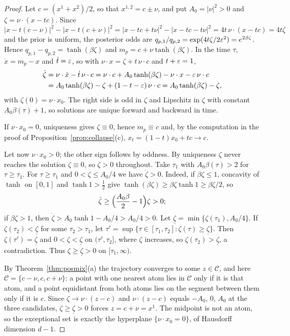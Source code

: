 \documentclass{article} %
\makeatletter
\newif\ificlr
\newcommand{\placeblock}[1]{\ificlr\@nameuse{moved@#1}\fi}
\theoremstyle{plain}
\theoremstyle{definition}
\theoremstyle{remark}
\makeatother
\begin{document}
\label{apx:pf-hyperplane}
\ificlr\placeblock{hyperplane}\else\prophyperplane*\fi
\begin{proof}
Let $c=(x^1+x^2)/2$, so that $x^{1,2}=c\pm\nu$, and put $A_0=|\nu|^2>0$ and
$\zeta=\nu\cdot(x-tc)$. Since
\[
|x-t(c-\nu)|^2-|x-t(c+\nu)|^2=|x-tc+t\nu|^2-|x-tc-t\nu|^2=4t\,\nu\cdot(x-tc)=4t\zeta
\]
and the prior is uniform, the posterior odds are
$q_{p,1}/q_{p,2}=\exp(4t\zeta/2\varepsilon^2)=e^{2\beta\zeta}$. Hence $q_{p,1}-q_{p,2}=\tanh(\beta\zeta)$
and $m_p=c+\nu\tanh(\beta\zeta)$. In the time $\tau$, $\dot x=m_p-x$ and $\dot t=\varepsilon$, so with
$\nu\cdot x=\zeta+t\,\nu\cdot c$ and $t+\varepsilon=1$,
\begin{align*}
\dot\zeta&=\nu\cdot\dot x-\dot t\,\nu\cdot c
=\nu\cdot c+A_0\tanh(\beta\zeta)-\nu\cdot x-\varepsilon\,\nu\cdot c\\
&=A_0\tanh(\beta\zeta)-\zeta+(1-t-\varepsilon)\,\nu\cdot c
=A_0\tanh(\beta\zeta)-\zeta,
\end{align*}
with $\zeta(0)=\nu\cdot x_0$. The right side is odd in $\zeta$ and Lipschitz in $\zeta$ with constant
$A_0\beta(\tau)+1$, so solutions are unique forward and backward in time.

If $\nu\cdot x_0=0$, uniqueness gives $\zeta\equiv0$, hence $m_p\equiv c$ and, by the computation in
the proof of Proposition~\ref{prop:collapse}(c), $x_t=(1-t)x_0+tc\to c$.

Let now $\nu\cdot x_0>0$; the other sign follows by oddness. By uniqueness $\zeta$ never reaches the
solution $\zeta\equiv0$, so $\zeta>0$ throughout. Take $\tau_1$ with $A_0\beta(\tau)>2$ for
$\tau\ge\tau_1$. For $\tau\ge\tau_1$ and $0<\zeta\le A_0/4$ we have $\dot\zeta>0$. Indeed, if
$\beta\zeta\le1$, concavity of $\tanh$ on $[0,1]$ and $\tanh1>\tfrac12$ give
$\tanh(\beta\zeta)\ge\beta\zeta\tanh1\ge\beta\zeta/2$, so
\[
\dot\zeta\ge\Bigl(\frac{A_0\beta}2-1\Bigr)\zeta>0 ;
\]
if $\beta\zeta>1$, then $\dot\zeta>A_0\tanh1-A_0/4>A_0/4>0$. Let
$\underline\zeta=\min\{\zeta(\tau_1),A_0/4\}$. If $\zeta(\tau_2)<\underline\zeta$ for some
$\tau_2>\tau_1$, let $\tau'=\sup\{\tau\in[\tau_1,\tau_2]:\zeta(\tau)\ge\underline\zeta\}$. Then
$\zeta(\tau')=\underline\zeta$ and $0<\zeta<\underline\zeta$ on $(\tau',\tau_2]$, where $\zeta$
increases, so $\zeta(\tau_2)>\underline\zeta$, a contradiction. Thus $\zeta\ge\underline\zeta>0$ on
$[\tau_1,\infty)$.

By Theorem~\ref{thm:posmix}(a) the trajectory converges to some $z\in\mathcal C$, and here
$\mathcal C=\{c-\nu,c,c+\nu\}$: a point with one nearest atom lies in $\mathcal C$ only if it is that
atom, and a point equidistant from both atoms lies on the segment between them only if it is $c$.
Since $\zeta\to\nu\cdot(z-c)$ and $\nu\cdot(z-c)$ equals $-A_0$, $0$, $A_0$ at the three candidates,
$\zeta\ge\underline\zeta>0$ forces $z=c+\nu=x^1$. The midpoint is not an atom, so the exceptional
set is exactly the hyperplane $\{\nu\cdot x_0=0\}$, of Hausdorff dimension $d-1$.
\end{proof}
\end{document}
